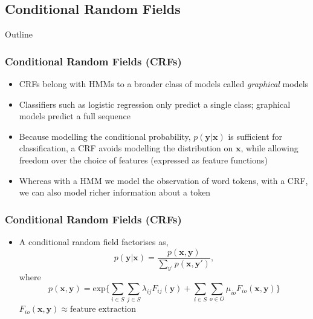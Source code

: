 \documentclass{beamer}
\begin{document}

\subsection{Conditional Random Fields}


\begin{frame}[noframenumbering]{Outline}
\tableofcontents[currentsubsection]
\end{frame}


\begin{frame}
\frametitle{Conditional Random Fields (CRFs)}
\begin{itemize}
\item CRFs belong with HMMs to a broader class of models called \emph{graphical} models
\item Classifiers such as logistic regression only predict a single class; graphical models predict a full sequence
\item Because modelling the conditional probability, $p(\textbf{y} | \textbf{x})$ is sufficient for classification, a CRF avoids modelling the distribution on $\textbf{x}$, while allowing freedom over the choice of features (expressed as feature functions)
\item Whereas with a HMM we model the observation of word tokens, with a CRF, we can also model richer information about a token
\end{itemize}
\end{frame}


\begin{frame}

\frametitle{Conditional Random Fields (CRFs)}
\begin{itemize}
\item A conditional random field factorises as,
$$p(\textbf{y}|\textbf{x}) = \frac{p(\textbf{x}, \textbf{y})}{\sum_{y'}{p(\textbf{x}, \textbf{y}')}},$$ where
$$
p(\textbf{x}, \textbf{y}) = \text{exp} \Bigg\{
\sum_{i \in S}
\sum_{j \in S}
\lambda_{ij}
F_{ij}(\textbf{y})
+ 
\sum_{i \in S}
\sum_{o \in O}
\mu_{io}
F_{io}(\textbf{x}, \textbf{y})
\Bigg\}
$$
$F_{io}(\textbf{x}, \textbf{y}) \approx \text{feature extraction}$
\end{itemize}

\end{frame}
\end{document}
